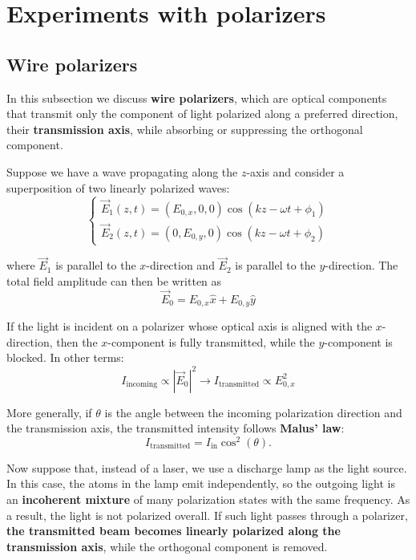 \section{Experiments with polarizers}\label{sec:exp-with-polarizers}

\subsection{Wire polarizers}\label{subsec:wire-polarizers}
In this subsection we discuss \textbf{wire polarizers}, which are optical components that transmit only the component of light polarized along a preferred direction, their \textbf{transmission axis}, while absorbing or suppressing the orthogonal component.

Suppose we have a wave propagating along the $z$-axis and consider a superposition of two linearly polarized waves:
\begin{equation*}
\begin{cases}
    \vec{E}_1(z,t) = (E_{0,x},0,0)\cos(kz-\omega t+\phi_1)\\[0.5ex]
    \vec{E}_2(z,t) = (0,E_{0,y},0)\cos(kz-\omega t+\phi_2)
\end{cases}
\end{equation*}

where $\vec{E}_1$ is parallel to the $x$-direction and $\vec{E}_2$ is parallel to the $y$-direction. The total field amplitude can then be written as
\begin{equation}\label{eqn:4-field-amplitude}
    \vec{E}_0 = E_{0,x} \hat{x} + E_{0,y} \hat{y}
\end{equation}

If the light is incident on a polarizer whose optical axis is aligned with the $x$-direction, then the $x$-component is fully transmitted, while the $y$-component is blocked. In other terms:
\[
I_{\text{incoming}} \propto |\vec{E}_0|^2
\longrightarrow
I_{\text{transmitted}} \propto E_{0,x}^2
\]

More generally, if $\theta$ is the angle between the incoming polarization direction and the transmission axis, the transmitted intensity follows \textbf{Malus' law}:
\begin{equation}\label{eqn:malus-law}
I_{\text{transmitted}} = I_{\text{in}} \cos^2(\theta).
\end{equation}

Now suppose that, instead of a laser, we use a discharge lamp as the light source. In this case, the atoms in the lamp emit independently, so the outgoing light is an \textbf{incoherent mixture} of many polarization states with the same frequency. As a result, the light is not polarized overall. If such light passes through a polarizer, \textbf{the transmitted beam becomes linearly polarized along the transmission axis}, while the orthogonal component is removed.

